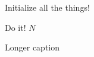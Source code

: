
\begin{algorithm}
\begin{algorithmic}[1]
\State Initialize all the things!

\State Do it!
\EndFor
\State \Return $N$
\EndProcedure
\end{algorithmic}
\caption[short caption]{Longer caption}
\label{algTemplate}
\end{algorithm}
